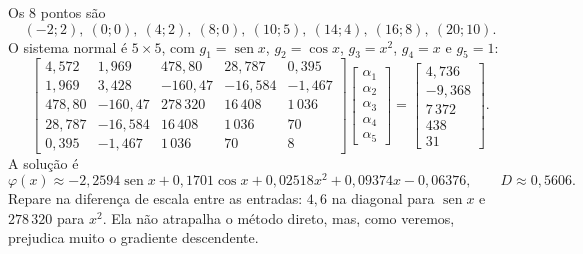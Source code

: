 \begin{exemplo}[{: $\varphi(x)=\alpha_1\operatorname{sen}x+\alpha_2\cos x+\alpha_3x^2+\alpha_4x+\alpha_5$}]\label{ex:comb}
Os 8 pontos são
\[
(-2;2),\ (0;0),\ (4;2),\ (8;0),\ (10;5),\ (14;4),\ (16;8),\ (20;10).
\]
O sistema normal é $5\times5$, com $g_1=\operatorname{sen}x$, $g_2=\cos x$, $g_3=x^2$, $g_4=x$ e $g_5=1$:
\[
\begin{bmatrix}
4{,}572 & 1{,}969 & 478{,}80 & 28{,}787 & 0{,}395\\
1{,}969 & 3{,}428 & -160{,}47 & -16{,}584 & -1{,}467\\
478{,}80 & -160{,}47 & 278\,320 & 16\,408 & 1\,036\\
28{,}787 & -16{,}584 & 16\,408 & 1\,036 & 70\\
0{,}395 & -1{,}467 & 1\,036 & 70 & 8
\end{bmatrix}
\begin{bmatrix}\alpha_1\\ \alpha_2\\ \alpha_3\\ \alpha_4\\ \alpha_5\end{bmatrix}=
\begin{bmatrix}4{,}736\\ -9{,}368\\ 7\,372\\ 438\\ 31\end{bmatrix}.
\]
A solução é
\[
\varphi(x)\approx-2{,}2594\operatorname{sen}x+0{,}1701\cos x+0{,}02518x^2+0{,}09374x-0{,}06376,
\qquad D\approx0{,}5606 .
\]
Repare na diferença de escala entre as entradas: $4{,}6$ na diagonal para $\operatorname{sen}x$ e
$278\,320$ para $x^2$. Ela não atrapalha o método direto, mas, como veremos, prejudica muito o gradiente descendente.
\end{exemplo}

\begin{center}
\end{center}

